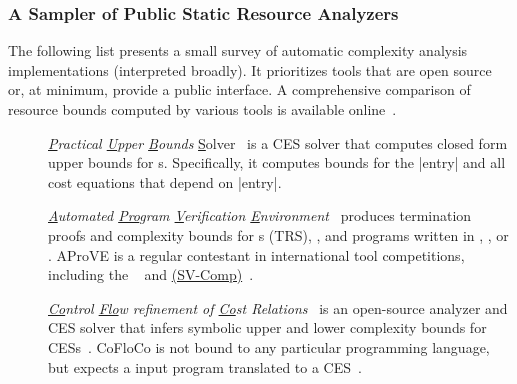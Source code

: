 \subsubsection{A Sampler of Public Static Resource Analyzers}
\label{resource-analysis-tools}

The following list presents a small survey of automatic complexity analysis
implementations (interpreted broadly). It prioritizes tools that are open source
or, at minimum, provide a public interface. A comprehensive comparison of
resource bounds computed by various tools is available
online~\cite{flores_experiments}.

\begin{description}

\item[\href{https://costa.fdi.ucm.es/~costa/pubs/pubs.php}{}]
      \emph{\underline{P}ractical \underline{U}pper \underline{B}ounds}
      \underline{S}olver~\cite{albert2010}
      is a CES solver that computes closed form upper bounds for s. Specifically, it computes bounds for the \pr|entry| and
      all cost equations that depend on \pr|entry|.

\item[\href{https://aprove.informatik.rwth-aachen.de}{}]
      \emph{\underline{A}utomated \underline{Pro}gram \underline{V}erification
      \underline{E}nvironment}~\cite{giesl2016} produces termination proofs and
      complexity bounds for s (TRS), , and programs written in , ,
      or .
      AProVE is a regular contestant in international tool competitions,
      including the
      \href{https://termination-portal.org/wiki/Termination_Competition}%
      {}~\cite{giesl2019}
      and \href{https://sv-comp.sosy-lab.org}%
      { (SV-Comp)}~\cite{beyer2022}.

\item[\href{https://github.com/aeflores/CoFloCo}{}]
      \emph{\underline{Co}ntrol \underline{Flo}w refinement of \underline{Co}st
      Relations}~\cite{floresmontoya2014}
      is an open-source analyzer and CES solver that infers symbolic upper and
      lower complexity bounds for CESs~\cite{flores-montoya2016}.
      CoFloCo is not bound to any particular programming language, but expects a
      input program translated to a CES~\cite{flores2016}.


\end{description}
